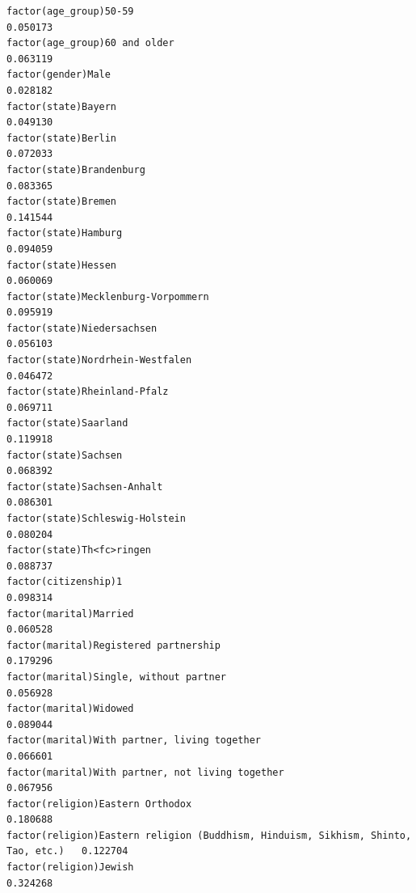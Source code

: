 \documentclass[
]{article}
\begin{document}
\begin{table}
\begin{minipage}[t]{\linewidth}
{\begin{verbatim}
factor(age_group)50-59                                                              0.050173
factor(age_group)60 and older                                                       0.063119
factor(gender)Male                                                                  0.028182
factor(state)Bayern                                                                 0.049130
factor(state)Berlin                                                                 0.072033
factor(state)Brandenburg                                                            0.083365
factor(state)Bremen                                                                 0.141544
factor(state)Hamburg                                                                0.094059
factor(state)Hessen                                                                 0.060069
factor(state)Mecklenburg-Vorpommern                                                 0.095919
factor(state)Niedersachsen                                                          0.056103
factor(state)Nordrhein-Westfalen                                                    0.046472
factor(state)Rheinland-Pfalz                                                        0.069711
factor(state)Saarland                                                               0.119918
factor(state)Sachsen                                                                0.068392
factor(state)Sachsen-Anhalt                                                         0.086301
factor(state)Schleswig-Holstein                                                     0.080204
factor(state)Th<fc>ringen                                                           0.088737
factor(citizenship)1                                                                0.098314
factor(marital)Married                                                              0.060528
factor(marital)Registered partnership                                               0.179296
factor(marital)Single, without partner                                              0.056928
factor(marital)Widowed                                                              0.089044
factor(marital)With partner, living together                                        0.066601
factor(marital)With partner, not living together                                    0.067956
factor(religion)Eastern Orthodox                                                    0.180688
factor(religion)Eastern religion (Buddhism, Hinduism, Sikhism, Shinto, Tao, etc.)   0.122704
factor(religion)Jewish                                                              0.324268

\end{verbatim}}
\end{minipage}
\end{table}
\end{document}
